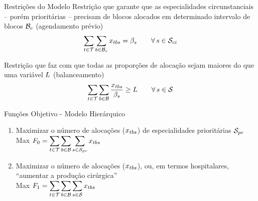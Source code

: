 \documentclass[handout]{beamer}
\begin{document}
\begin{frame}{Restrições do Modelo}
    Restrição que garante que as especialidades circunstanciais -- porém prioritárias -- precisam de blocos alocados em determinado intervalo de blocos $\mathcal{B}_{c}$ (agendamento prévio)
    \begin{equation}
    \label{eq:m2-12}
        \sum_{t \in \mathcal{T}} \sum_{b \in \mathcal{B}_{c}} x_{tbs} = \beta_{s} \hspace{2em} \forall\, s \in \mathcal{S}_{ci}
    \end{equation}
    \vspace{2em}

    Restrição que faz com que todas as proporções de alocação sejam maiores do que uma variável $L$ (balanceamento)
    \begin{equation}
    \label{eq:m2-13}
         \sum_{t \in \mathcal{T}} \sum_{b \in \mathcal{B}} \frac{x_{tbs}}{\beta_{s}} \geq L \hspace{2em} \forall\, s \in \mathcal{S}
    \end{equation}
\end{frame}


\begin{frame}{Funções Objetivo - Modelo Hierárquico}
    \begin{enumerate}
        \setlength\itemsep{2em}
        \item Maximizar o número de alocações ($x_{tbs}$) de especialidades prioritárias $\mathcal{S}_{pr}$\\
        \vspace{0.5em}
        Max $\displaystyle F_0 = \sum_{t \in \mathcal{T}} \sum_{b \in \mathcal{B}} \sum_{s \in \mathcal{S}_{pr}} x_{tbs}$ 

        \item Maximizar o número de alocações ($x_{tbs}$), ou, em termos hospitalares, ``aumentar a produção cirúrgica''\\
        \vspace{0.5em}
        Max $\displaystyle F_1 = \sum_{t \in \mathcal{T}} \sum_{b \in \mathcal{B}} \sum_{s \in \mathcal{S}} x_{tbs}$ 
    \end{enumerate}
\end{frame}
\end{document}
